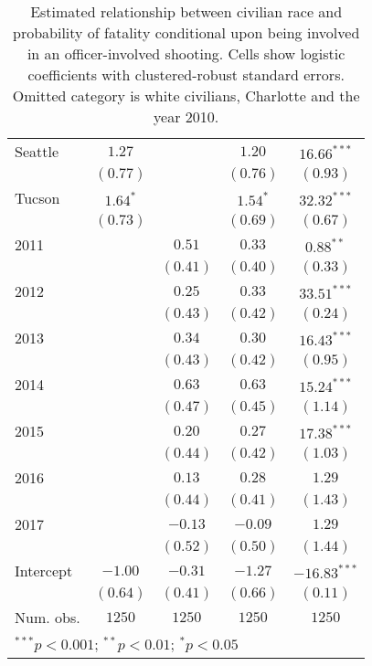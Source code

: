 \begin{table}[ht!]
\begin{center}
\begin{tabular}{l c c c c}
Seattle                    & $1.27$      &              & $1.20$      & $16.66^{***}$  \\
                           & $(0.77)$    &              & $(0.76)$    & $(0.93)$       \\
Tucson                     & $1.64^{*}$  &              & $1.54^{*}$  & $32.32^{***}$  \\
                           & $(0.73)$    &              & $(0.69)$    & $(0.67)$       \\
2011                       &             & $0.51$       & $0.33$      & $0.88^{**}$    \\
                           &             & $(0.41)$     & $(0.40)$    & $(0.33)$       \\
2012                       &             & $0.25$       & $0.33$      & $33.51^{***}$  \\
                           &             & $(0.43)$     & $(0.42)$    & $(0.24)$       \\
2013                       &             & $0.34$       & $0.30$      & $16.43^{***}$  \\
                           &             & $(0.43)$     & $(0.42)$    & $(0.95)$       \\
2014                       &             & $0.63$       & $0.63$      & $15.24^{***}$  \\
                           &             & $(0.47)$     & $(0.45)$    & $(1.14)$       \\
2015                       &             & $0.20$       & $0.27$      & $17.38^{***}$  \\
                           &             & $(0.44)$     & $(0.42)$    & $(1.03)$       \\
2016                       &             & $0.13$       & $0.28$      & $1.29$         \\
                           &             & $(0.44)$     & $(0.41)$    & $(1.43)$       \\
2017                       &             & $-0.13$      & $-0.09$     & $1.29$         \\
                           &             & $(0.52)$     & $(0.50)$    & $(1.44)$       \\
Intercept                  & $-1.00$     & $-0.31$      & $-1.27$     & $-16.83^{***}$ \\
                           & $(0.64)$    & $(0.41)$     & $(0.66)$    & $(0.11)$       \\
\midrule
Num. obs.                  & $1250$      & $1250$       & $1250$      & $1250$         \\
\bottomrule
\multicolumn{5}{l}{\scriptsize{$^{***}p<0.001$; $^{**}p<0.01$; $^{*}p<0.05$}}
\end{tabular}
\caption{Estimated relationship between civilian race and probability of fatality conditional upon being involved in an officer-involved shooting. Cells show logistic coefficients with clustered-robust standard errors. Omitted category is white civilians, Charlotte and the year 2010.}
\label{tab:logistic_FE}
\end{center}
\end{table}
